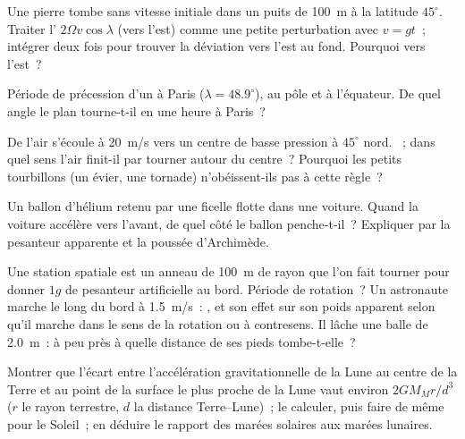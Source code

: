 \begin{exercise}[$\star\star$]\label{exo:b1:non-inertial-frames:7}
Une pierre tombe sans vitesse initiale dans un puits de \qty{100}{m} à la
latitude $45^\circ$. Traiter l' $2\Omega v\cos\lambda$
(vers l'est) comme une petite perturbation avec $v = gt$~; intégrer deux
fois pour trouver la déviation vers l'est au fond. Pourquoi vers l'est~?
\end{exercise}

\begin{exercise}[$\star\star$]\label{exo:b1:non-inertial-frames:8}
Période de précession d'un  à Paris ($\lambda = 48.9^\circ$),
au pôle et à l'équateur. De quel angle le plan tourne-t-il en une heure
à Paris~?
\end{exercise}

\begin{exercise}[$\star\star$]\label{exo:b1:non-inertial-frames:9}
De l'air s'écoule à \qty{20}{m/s} vers un centre de basse pression à
$45^\circ$ nord. ~; dans quel sens l'air
finit-il par tourner autour du centre~? Pourquoi les petits tourbillons
(un évier, une tornade) n'obéissent-ils pas à cette règle~?
\end{exercise}

\begin{exercise}[$\star\star\star$]\label{exo:b1:non-inertial-frames:10}
Un ballon d'hélium retenu par une ficelle flotte dans une voiture. Quand
la voiture accélère vers l'avant, de quel côté le ballon penche-t-il~?
Expliquer par la pesanteur apparente et la poussée d'Archimède.
\end{exercise}

\begin{exercise}[$\star\star\star$]\label{exo:b1:non-inertial-frames:11}
Une station spatiale est un anneau de \qty{100}{m} de rayon que l'on fait
tourner pour donner $1g$ de pesanteur artificielle au bord. Période de
rotation~? Un astronaute marche le long du bord à \qty{1.5}{m/s}~:
, et son effet sur son poids apparent selon
qu'il marche dans le sens de la rotation ou à contresens. Il lâche une
balle de \qty{2.0}{m}~: à peu près à quelle distance de ses pieds tombe-t-elle~?
\end{exercise}

\begin{exercise}[$\star\star\star$]\label{exo:b1:non-inertial-frames:12}
Montrer que l'écart entre l'accélération gravitationnelle de la Lune au
centre de la Terre et au point de la surface le plus proche de la Lune
vaut environ $2GM_Mr/d^3$ ($r$ le rayon terrestre, $d$ la distance
Terre--Lune)~; le calculer, puis faire de même pour le Soleil~; en
déduire le rapport des marées solaires aux marées lunaires.
\end{exercise}

